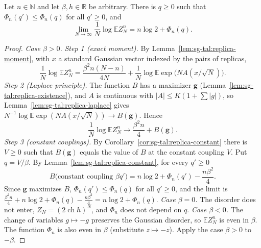 \begin{theorem}[Theorem~1.13.1, Eq.~(1.396)]\label{thm:sg-tal:replica}
\leanok
{}
Let $n\in\mathbb N$ and let $\beta,h\in\mathbb R$ be arbitrary. There is $q\ge0$ such that $\Phi_n(q')\le\Phi_n(q)$ for all $q'\ge0$, and
\[
\lim_{N\to\infty}\frac1N\log\mathbb E Z_N^n=n\log2+\Phi_n(q).
\]
\end{theorem}
\begin{proof}
\leanok
\emph{Case $\beta>0$.}
\emph{Step 1 (exact moment).} By Lemma~\ref{lem:sg-tal:replica-moment}, with $x$ a standard Gaussian vector indexed by the pairs of replicas,
\[
\frac1N\log\mathbb EZ_N^n=\frac{\beta^2n(N-n)}{4N}+\frac1N\log\mathbb E\exp\big(NA(x/\sqrt N)\big).
\]
\emph{Step 2 (Laplace principle).} The function $B$ has a maximizer $\mathbf g$ (Lemma~\ref{lem:sg-tal:replica-existence}), and $A$ is continuous with $|A|\le K(1+\sum|g|)$, so Lemma~\ref{lem:sg-tal:replica-laplace} gives $N^{-1}\log\mathbb E\exp(NA(x/\sqrt N))\to B(\mathbf g)$. Hence
\[
\frac1N\log\mathbb EZ_N^n\longrightarrow\frac{\beta^2n}4+B(\mathbf g).
\]
\emph{Step 3 (constant couplings).} By Corollary~\ref{cor:sg-tal:replica-constant} there is $V\ge0$ such that $B(\mathbf g)$ equals the value of $B$ at the constant coupling $V$. Put $q=V/\beta$. By Lemma~\ref{lem:sg-tal:replica-constant}, for every $q'\ge0$
\[
B\big(\text{constant coupling }\beta q'\big)=n\log2+\Phi_n(q')-\frac{n\beta^2}4 .
\]
Since $\mathbf g$ maximizes $B$, $\Phi_n(q')\le\Phi_n(q)$ for all $q'\ge0$, and the limit is $\frac{\beta^2n}4+n\log2+\Phi_n(q)-\frac{n\beta^2}4=n\log2+\Phi_n(q)$.
\emph{Case $\beta=0$.} The disorder does not enter, $Z_N=(2\operatorname{ch}h)^N$, and $\Phi_n$ does not depend on $q$.
\emph{Case $\beta<0$.} The change of variables $g\mapsto-g$ preserves the Gaussian disorder, so $\mathbb EZ_N^n$ is even in $\beta$. The function $\Phi_n$ is also even in $\beta$ (substitute $z\mapsto-z$). Apply the case $\beta>0$ to $-\beta$.
\end{proof}

